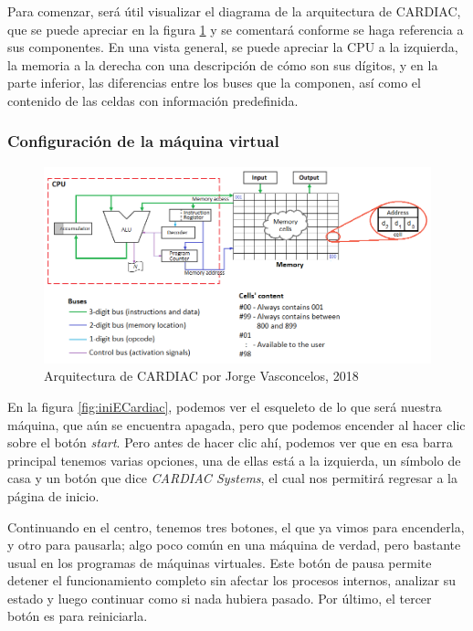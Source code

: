 \documentclass[letterpaper,12pt,oneside]{book}
\begin{document}
    Para comenzar, será útil visualizar el diagrama de la arquitectura de CARDIAC,
	que se puede apreciar en la figura \ref{fig:arqCardiac} y se comentará conforme se haga referencia a sus componentes. En
	una vista general, se puede apreciar la CPU a la izquierda, la memoria a la derecha con una descripción de cómo son sus dígitos, y en la 
	parte inferior, las diferencias entre los buses que la componen, así como el contenido de las celdas con información predefinida.

    \subsubsection{Configuración de la máquina virtual}
    
	\begin{figure}[h]
 			\centering
			\includegraphics[scale=0.5]{media/ECARDIAC/arq_cardiac.png}
			\caption{Arquitectura de CARDIAC por Jorge Vasconcelos, 2018}
			\label{fig:arqCardiac}
	\end{figure}	
	
	En la figura \ref{fig:iniECardiac}, podemos ver el esqueleto de lo que será nuestra máquina, que aún se encuentra apagada, pero que podemos encender al hacer clic sobre el botón \textit{start}. Pero antes de hacer clic ahí, podemos
	ver que en esa barra principal tenemos varias opciones, una de ellas está a la izquierda, un símbolo de casa y un botón que dice \textit{CARDIAC Systems}, el cual
	nos permitirá regresar a la página de inicio.
 
    Continuando en el centro, tenemos tres botones, el que ya vimos para encenderla, y otro para pausarla; algo poco común en una máquina de verdad, pero bastante usual en los programas de máquinas virtuales. Este botón de pausa
	permite detener el funcionamiento completo sin afectar los procesos internos, analizar su estado
	y luego continuar como si nada hubiera pasado. Por último, el tercer botón es para reiniciarla.
	
\end{document}
